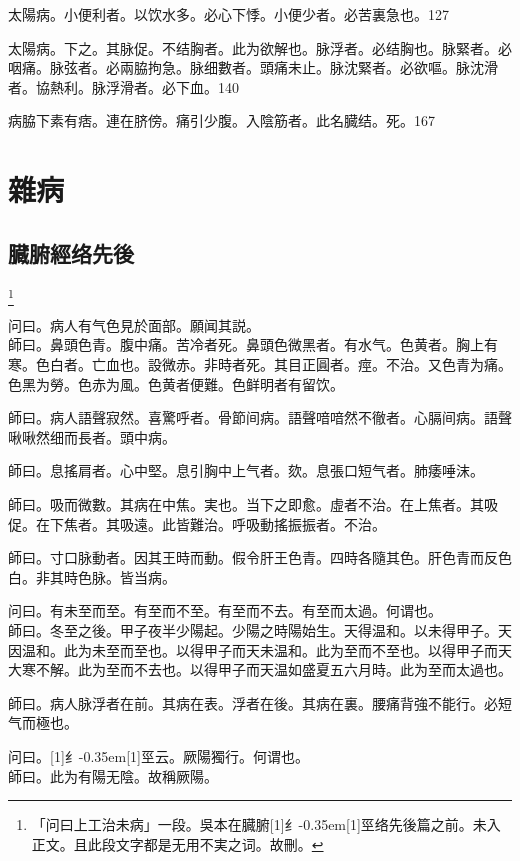 \documentclass[oneside,b4paper]{ctexbook}
\begin{document}
\begin{flushleft}
太陽病。小便利者。以饮水多。必心下悸。小便少者。必苦裏急也。127

太陽病。下之。其脉促。不结胸者。此为欲解也。脉浮者。必结胸也。脉緊者。必咽痛。脉弦者。必兩脇拘急。脉细數者。頭痛未止。脉沈緊者。必欲嘔。脉沈滑者。協熱利。脉浮滑者。必下血。140

病脇下素有痞。連在脐傍。痛引少腹。入陰筋者。此名臓结。死。167

\part{雜病}

\chapter{臓腑經络先後}

\footnote{「问曰上工治未病」一段。吳本在臓腑{\hbox{\scalebox{0.68}[1]{纟}\kern-0.35em\scalebox{0.64}[1]{巠}}}络先後篇之前。未入正文。且此段文字都是无用不実之词。故刪。}

问曰。病人有气色見於面部。願闻其説。\\
師曰。鼻頭色青。腹中痛。苦冷者死。鼻頭色微黑者。有水气。色黄者。胸上有寒。色白者。亡血也。設微赤。非時者死。其目正圓者。痙。不治。又色青为痛。色黑为勞。色赤为風。色黄者便難。色鲜明者有留饮。

師曰。病人語聲寂然。喜驚呼者。骨節间病。語聲喑喑然不徹者。心膈间病。語聲啾啾然细而長者。頭中病。

師曰。息搖肩者。心中堅。息引胸中上气者。欬。息張口短气者。肺痿唾沫。

師曰。吸而微數。其病在中焦。実也。当下之即愈。虛者不治。在上焦者。其吸促。在下焦者。其吸遠。此皆難治。呼吸動搖振振者。不治。

師曰。寸口脉動者。因其王時而動。假令肝王色青。四時各隨其色。肝色青而反色白。非其時色脉。皆当病。

问曰。有未至而至。有至而不至。有至而不去。有至而太過。何谓也。\\
師曰。冬至之後。甲子夜半少陽起。少陽之時陽始生。天得温和。以未得甲子。天因温和。此为未至而至也。以得甲子而天未温和。此为至而不至也。以得甲子而天大寒不解。此为至而不去也。以得甲子而天温如盛夏五六月時。此为至而太過也。

師曰。病人脉浮者在前。其病在表。浮者在後。其病在裏。腰痛背強不能行。必短气而極也。

问曰。{\hbox{\scalebox{0.68}[1]{纟}\kern-0.35em\scalebox{0.64}[1]{巠}}}云。厥陽獨行。何谓也。\\
師曰。此为有陽无陰。故稱厥陽。


\end{flushleft}
\end{document}
